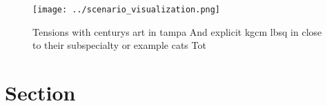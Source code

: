 \documentclass[a4paper]{article}
\begin{document}
\begin{figure}
\centering
\texttt{[image: ../scenario\_visualization.png]}
\caption{Tensions with centurys art in tampa And explicit kgcm lbsq in close to their subspecialty or example cats Tot
}
\end{figure}
 
\section{Section}
\end{document}
